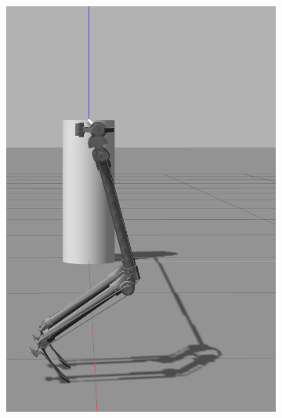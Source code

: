 \begin{figure}[ht!]
    \centering
    \begin{subfigure}[b]{0.16\textwidth}
        \includegraphics[width=\textwidth]{figures/gazebo_jumping_1}
    \end{subfigure}
    \begin{subfigure}[b]{0.16\textwidth}

\end{subfigure}
\end{figure}
